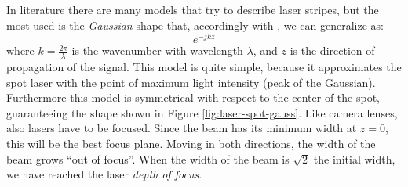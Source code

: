 In literature there are many models that try to describe laser stripes, but the most used is the \textit{Gaussian} shape that, accordingly with \cite{saleh2013fundamentals}, we can generalize as:
  \begin{equation}
    e^{-jkz}
    \label{eq:general-gauss-model}
  \end{equation}
where $k = \frac{2\pi}{\lambda}$ is the wavenumber with wavelength $\lambda$, and $z$ is the direction of propagation of the signal. This model is quite simple, because it approximates the spot laser with the point of maximum light intensity (peak of the Gaussian). Furthermore this model is symmetrical with respect to the center of the spot, guaranteeing the shape shown in Figure \ref{fig:laser-spot-gauss}. Like camera lenses, also lasers have to be focused. Since the beam has its minimum width at $z = 0$, this will be the best focus plane. Moving in both directions, the width of the beam grows ``out of focus''. When the width of the beam is $\sqrt{2}$ the initial width, we have reached the laser \textit{depth of focus}.
